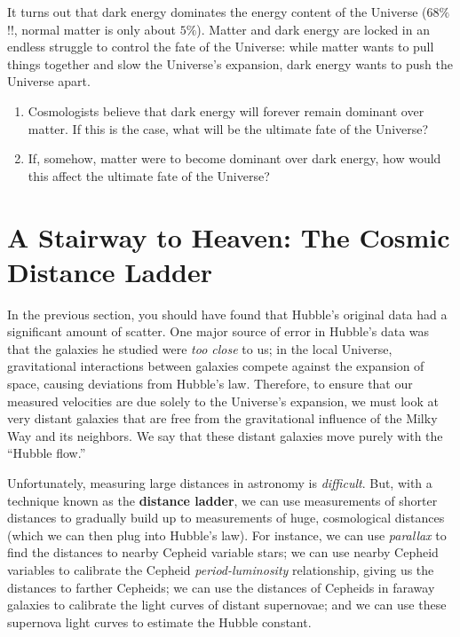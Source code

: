\documentclass[11pt]{article}
\begin{document}
It turns out that dark energy dominates the energy content of the Universe ($68\%$!!, normal matter is only about $5\%$).  Matter and dark energy are locked in an endless struggle to control the fate of the Universe: while matter wants to pull things together and slow the Universe's expansion, dark energy wants to push the Universe apart.
\begin{enumerate}[resume]
    \item Cosmologists believe that dark energy will forever remain dominant over matter. If this is the case, what will be the ultimate fate of the Universe?
    
    \item If, somehow, matter were to become dominant over dark energy, how would this affect the ultimate fate of the Universe?
\end{enumerate}


\section{A Stairway to Heaven: The Cosmic Distance Ladder}

In the previous section, you should have found that Hubble's original data had a significant amount of scatter. One major source of error in Hubble's data was that the galaxies he studied were \emph{too close} to us; in the local Universe, gravitational interactions between galaxies compete against the expansion of space, causing deviations from Hubble's law. Therefore, to ensure that our measured velocities are due solely to the Universe's expansion, we must look at very distant galaxies that are free from the gravitational influence of the Milky Way and its neighbors. We say that these distant galaxies move purely with the ``Hubble flow.''

\medskip \noindent
Unfortunately, measuring large distances in astronomy is \emph{difficult}. But, with a technique known as the \textbf{distance ladder}, we can use measurements of shorter distances to gradually build up to measurements of huge, cosmological distances (which we can then plug into Hubble's law). For instance, we can use \emph{parallax} to find the distances to nearby Cepheid variable stars; we can use nearby Cepheid variables to calibrate the Cepheid \emph{period-luminosity} relationship, giving us the distances to farther Cepheids; we can use the distances of Cepheids in faraway galaxies to calibrate the light curves of distant supernovae; and we can use these supernova light curves to estimate the Hubble constant.
\end{document}
